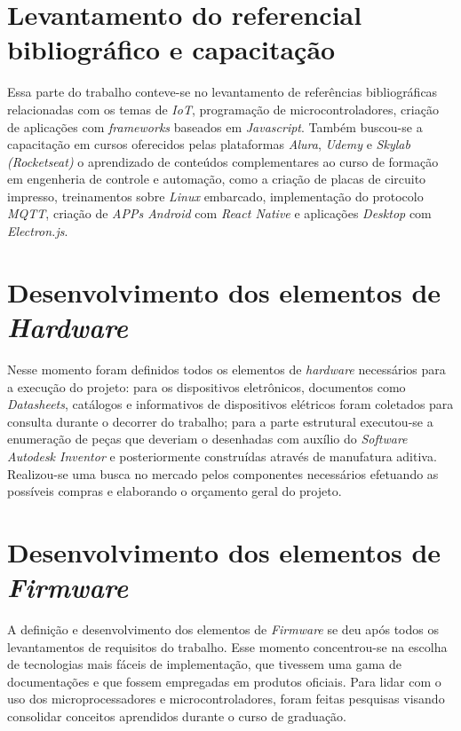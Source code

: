\section{Levantamento do referencial bibliográfico e capacitação}
\label{sec:metmodal}

Essa parte do trabalho conteve-se no levantamento de referências bibliográficas relacionadas com os temas de \textit{IoT}, programação de microcontroladores, criação de aplicações com \textit{frameworks} baseados em \textit{Javascript}. Também buscou-se a capacitação em cursos oferecidos pelas plataformas \textit{Alura}, \textit{Udemy} e \textit{Skylab (Rocketseat)} o aprendizado de conteúdos complementares ao curso de formação em engenheria de controle e automação, como a criação de placas de circuito impresso, treinamentos sobre \textit{Linux} embarcado, implementação do protocolo \textit{MQTT}, criação de \textit{APPs Android} com \textit{React Native} e aplicações \textit{Desktop} com \textit{Electron.js}.

\section{Desenvolvimento dos elementos de \textit{Hardware}}
\label{sec: dev_ele_hardware}

Nesse momento foram definidos todos os elementos de \textit{hardware} necessários para a execução do projeto: para os dispositivos eletrônicos, documentos como \textit{Datasheets}, catálogos e informativos de dispositivos elétricos foram coletados para consulta durante o decorrer do trabalho; para a parte estrutural executou-se a enumeração de peças que deveriam o desenhadas com auxílio do \textit{Software Autodesk Inventor} e posteriormente construídas através de manufatura aditiva.  Realizou-se uma busca no mercado pelos componentes necessários efetuando as possíveis compras e elaborando o orçamento geral do projeto. 

\section{Desenvolvimento dos elementos de \textit{Firmware}}
\label{sec: dev_ele_hardware}

A definição e desenvolvimento dos elementos de \textit{Firmware} se deu após todos os levantamentos de requisitos do trabalho. Esse momento concentrou-se na escolha de tecnologias mais fáceis de implementação, que tivessem uma gama de documentações e que fossem empregadas em produtos oficiais. Para lidar com o uso dos microprocessadores e microcontroladores, foram feitas pesquisas visando consolidar conceitos aprendidos durante o curso de graduação.

